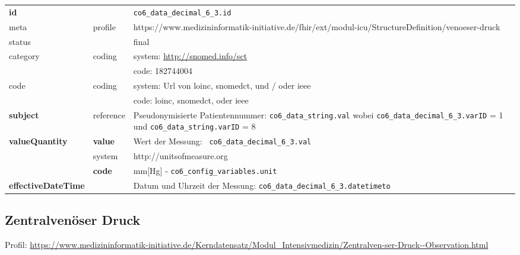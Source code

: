 \begin{longtable}{|l|l|p{7.5cm}|}
        \hline
        \rowcolor{lightgray} \multicolumn{3}{|l|}{Data Mapping (inhaltlich)} \\ \hline
        \textbf{id} &  & \texttt{co6\_data\_decimal\_6\_3.id} \\ \hline
	meta & profile & https://www.medizininformatik-initiative.de/fhir/ext/modul-icu/StructureDefinition/venoeser-druck \\ \hline 
	status &  & final   \\ \hline 
	category & coding & system: \url{http://snomed.info/sct} \\
\cline{3-3}
	& & code: 182744004 \\ \hline
	code & coding & system: Url von \ac{loinc}, \ac{snomedct}, und / oder \ac{ieee} \\ 
	\cline{3-3} 
	 &  & code: \ac{loinc}, \ac{snomedct}, oder \ac{ieee} \\ \hline
	 	\textbf{subject} & reference & Pseudonymisierte Patientennummer: \texttt{co6\_data\_string.val} wobei \texttt{co6\_data\_decimal\_6\_3.varID} = 1 und \texttt{co6\_data\_string.varID} = 8 \\ \hline
	 \textbf{valueQuantity}  & \textbf{value} & Wert der Messung: \texttt{
co6\_data\_decimal\_6\_3.val} \\
        \cline{2-3}
         & system & http://unitsofmeasure.org \\
         \cline{2-3}
         & \textbf{code} & mm[Hg] - \texttt{co6\_config\_variables.unit} \\ \hline
     \textbf{effectiveDateTime}  & & Datum und Uhrzeit der Messung: \texttt{co6\_data\_decimal\_6\_3.datetimeto} \\ \hline
\end{longtable}

\subsection{Zentralvenöser Druck} 

Profil: \url{https://www.medizininformatik-initiative.de/Kerndatensatz/Modul_Intensivmedizin/Zentralven-ser-Druck--Observation.html}

